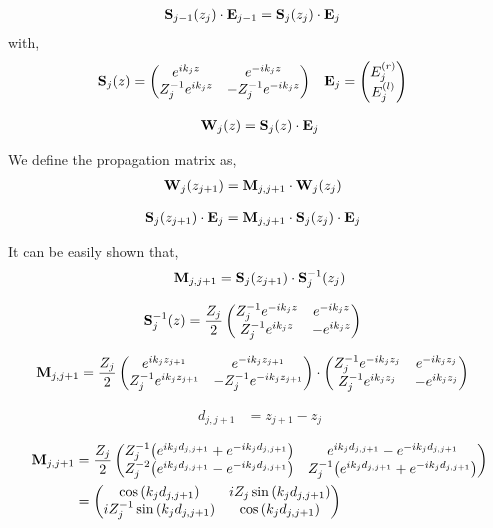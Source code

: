 \begin{align*}
	\vb{S}_{j-1}\pqty{z_j} \cdot \vb{E}_{j-1} &= \vb{S}_{j}\pqty{z_j} \cdot \vb{E}_{j}
\end{align*} with,
\begin{align*}
	\vb{S}_j\pqty{z} &= \pmqty{e^{ik_jz} & e^{-ik_jz} \\ Z_j^{-1}e^{ik_jz} & -Z_j^{-1}e^{-ik_jz}} & \vb{E}_j &= \pmqty{E^{(r)}_{j} \\  E^{(l)}_{j}}
\end{align*}


\begin{align*}
	\vb{W}_j\pqty{z} = \vb{S}_j\pqty{z} \cdot \vb{E}_j
\end{align*}

We define the propagation matrix as,
\begin{align*}
	\vb{W}_{j}\pqty{z_{j+1}} &= \vb{M}_{j,j+1} \cdot \vb{W}_{j}\pqty{z_{j}}
\end{align*}

\begin{align*}
	\vb{S}_{j}\pqty{z_{j+1}}\cdot\vb{E}_j &= \vb{M}_{j,j+1} \cdot \vb{S}_{j}\pqty{z_{j}}\cdot\vb{E}_j
\end{align*}

It can be easily shown that,
\begin{align*}
	\vb{M}_{j,j+1} = \vb{S}_{j}\pqty{z_{j+1}} \cdot \vb{S}^{-1}_{j}\pqty{z_j}
\end{align*}

\begin{align*}
	\vb{S}^{-1}_j\pqty{z} &= \frac{Z_j}{2}\pmqty{Z_j^{-1}e^{-ik_jz} & e^{-ik_jz} \\ Z_j^{-1}e^{ik_jz} & -e^{ik_jz}}
\end{align*}

\begin{align*}
	\vb{M}_{j,j+1} &= \frac{Z_{j}}{2}\pmqty{e^{ik_{j}z_{j+1}} & e^{-ik_{j}z_{j+1}} \\ Z_{j}^{-1}e^{ik_{j}z_{j+1}} & -Z_{j}^{-1}e^{-ik_{j}z_{j+1}}} \cdot
	\pmqty{Z_{j}^{-1}e^{-ik_{j}z_{j}} & e^{-ik_{j}z_{j}} \\ Z_{j}^{-1}e^{ik_{j}z_{j}} & -e^{ik_{j}z_{j}}} 
\end{align*}

\begin{align*}
	d_{j,j+1} &= z_{j+1} - z_{j}
\end{align*}

\begin{align*}
	\vb{M}_{j,j+1} &= \frac{Z_{j}}{2}\pmqty{
		Z_{j}^{-1} \pqty{e^{ik_{j}d_{j,j+1}} + e^{-ik_{j}d_{j,j+1}}} 
		& e^{ik_{j}d_{j,j+1}} - e^{-ik_{j}d_{j,j+1}} \\ 
		Z_{j}^{-2} \pqty{e^{ik_{j}d_{j,j+1}} - e^{-ik_{j}d_{j,j+1}}} & 
		Z_{j}^{-1} \pqty{e^{ik_{j}d_{j,j+1}} + e^{-ik_{j}d_{j,j+1}}}} \\
	&= \pmqty{
		\cos\pqty{k_{j}d_{j,j+1}}
		& iZ_{j}\sin\pqty{k_{j}d_{j,j+1}} \\ 
		iZ_{j}^{-1}\sin\pqty{k_{j}d_{j,j+1}} & 
		\cos\pqty{k_{j}d_{j,j+1}}}
\end{align*}

